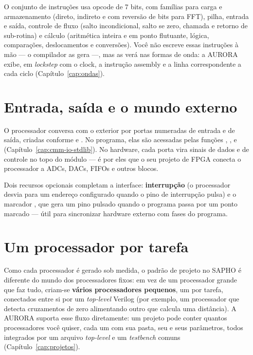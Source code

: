 O conjunto de instruções usa opcode de 7 bits, com famílias para carga e armazenamento (direto, indireto e com reversão de bits para FFT), pilha, entrada e saída, controle de fluxo (salto incondicional, salto se zero, chamada e retorno de sub-rotina) e cálculo (aritmética inteira e em ponto flutuante, lógica, comparações, deslocamentos e conversões). Você não escreve essas instruções à mão --- o compilador \cmm{} as gera ---, mas as verá nas formas de onda: a AURORA exibe, em \emph{lockstep} com o clock, a instrução assembly e a linha \cmm{} correspondente a cada ciclo (Capítulo~\ref{cap:ondas}).

\section{Entrada, saída e o mundo externo}

O processador conversa com o exterior por portas numeradas de entrada e de saída, criadas conforme  e . No programa, elas são acessadas pelas funções , ,  e  (Capítulo~\ref{cap:cmm-io-stdlib}). No hardware, cada porta vira sinais de dados e de controle no topo do módulo  --- é por eles que o seu projeto de FPGA conecta o processador a ADCs, DACs, FIFOs e outros blocos.

Dois recursos opcionais completam a interface: \textbf{interrupção} (o processador desvia para um endereço configurado quando o pino de interrupção pulsa) e o marcador , que gera um pino  pulsado quando o programa passa por um ponto marcado --- útil para sincronizar hardware externo com fases do programa.

\section{Um processador por tarefa}

Como cada processador é gerado sob medida, o padrão de projeto no SAPHO é diferente do mundo dos processadores fixos: em vez de um processador grande que faz tudo, criam-se \textbf{vários processadores pequenos}, um por tarefa, conectados entre si por um \emph{top-level} Verilog (por exemplo, um processador que detecta cruzamentos de zero alimentando outro que calcula uma distância). A AURORA suporta esse fluxo diretamente: um projeto pode conter quantos processadores você quiser, cada um com sua pasta, seu  e seus parâmetros, todos integrados por um arquivo \emph{top-level} e um \emph{testbench} comuns (Capítulo~\ref{cap:projetos}).
